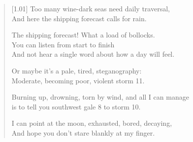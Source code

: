 \begin{verse}[1.01\textwidth]
  Too many wine-dark seas need daily traversal,\\
  And here the shipping forecast calls for rain.

  The shipping forecast! What a load of bollocks.\\
  You can listen from start to finish\\
  And not hear a single word about how a day will feel.

  Or maybe it's a pale, tired, steganography:\\
  Moderate, becoming poor, violent storm 11.

  Burning up, drowning, torn by wind, and all I can manage\\
  is to tell you southwest gale 8 to storm 10.

  I can point at the moon, exhausted, bored, decaying,\\
  And hope you don't stare blankly at my finger.
\end{verse}
